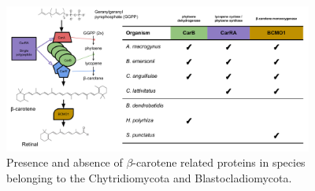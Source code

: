 \begin{figure}[hb]
  \centering
  \includegraphics[width=4in]{./Chapter_Coelomomyces/img/Figure_bcaroPresenceAbsence.png}
  \caption[$\beta$-carotene enzyme presence / absence]{Presence and absence of $\beta$-carotene related proteins in species belonging to the Chytridiomycota and Blastocladiomycota.}
  \label{fig:ChClat_Bcaro}
\end{figure}
